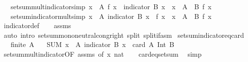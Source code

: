 \begin{isabellebody}
\ \ \ setsum{\isacharunderscore}mult{\isacharunderscore}indicator{\isacharbrackleft}simp{\isacharbrackright}{\isacharcolon}\ {\isachardoublequoteopen}{\isacharparenleft}{\isasymSum}x\ {\isasymin}\ A{\isachardot}\ f\ x\ {\isacharasterisk}\ indicator\ B\ x{\isacharparenright}\ {\isacharequal}\ {\isacharparenleft}{\isasymSum}x\ {\isasymin}\ A\ {\isasyminter}\ B{\isachardot}\ f\ x{\isacharparenright}{\isachardoublequoteclose}\isanewline
\ \ \ setsum{\isacharunderscore}indicator{\isacharunderscore}mult{\isacharbrackleft}simp{\isacharbrackright}{\isacharcolon}\ {\isachardoublequoteopen}{\isacharparenleft}{\isasymSum}x\ {\isasymin}\ A{\isachardot}\ indicator\ B\ x\ {\isacharasterisk}\ f\ x{\isacharparenright}\ {\isacharequal}\ {\isacharparenleft}{\isasymSum}x\ {\isasymin}\ A\ {\isasyminter}\ B{\isachardot}\ f\ x{\isacharparenright}{\isachardoublequoteclose}\isanewline
%
\isadelimproof
\ \ %
\endisadelimproof
%
\isatagproof
{}\isamarkupfalse%
\ indicator{\isacharunderscore}def\isanewline
\ \ \isamarkupfalse%
\ assms\ \isamarkupfalse%
\ {\isacharparenleft}auto\ intro{\isacharbang}{\isacharcolon}\ setsum{\isachardot}mono{\isacharunderscore}neutral{\isacharunderscore}cong{\isacharunderscore}right\ split{\isacharcolon}\ split{\isacharunderscore}if{\isacharunderscore}asm{\isacharparenright}%
\endisatagproof
{\isafoldproof}%
%
\isadelimproof
\isanewline
%
\endisadelimproof
\isanewline
{}\isamarkupfalse%
\ setsum{\isacharunderscore}indicator{\isacharunderscore}eq{\isacharunderscore}card{\isacharcolon}\isanewline
\ \ \ {\isachardoublequoteopen}finite\ A{\isachardoublequoteclose}\isanewline
\ \ \ {\isachardoublequoteopen}{\isacharparenleft}SUM\ x\ {\isacharcolon}\ A{\isachardot}\ indicator\ B\ x{\isacharparenright}\ {\isacharequal}\ card\ {\isacharparenleft}A\ Int\ B{\isacharparenright}{\isachardoublequoteclose}\isanewline
%
\isadelimproof
\ \ %
\endisadelimproof
%
\isatagproof
{}\isamarkupfalse%
\ setsum{\isacharunderscore}mult{\isacharunderscore}indicator{\isacharbrackleft}OF\ assms{\isacharcomma}\ of\ {\isachardoublequoteopen}{\isacharpercent}x{\isachardot}\ {}{\isacharcolon}{\isacharcolon}nat{\isachardoublequoteclose}{\isacharbrackright}\isanewline
\ \ \isamarkupfalse%
\ card{\isacharunderscore}eq{\isacharunderscore}setsum\ \isamarkupfalse%
\ simp%
\endisatagproof
{\isafoldproof}%
%
\isadelimproof
\isanewline
%
\endisadelimproof
\isanewline
{}\isamarkupfalse%

\end{isabellebody}
